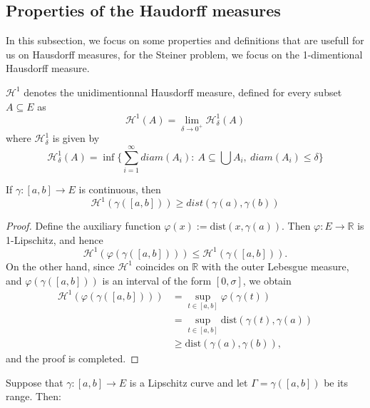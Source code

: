 \documentclass[12pt]{article}
\begin{document}
{\subsection{Properties of the Haudorff measures}

In this subsection, we focus on some properties and definitions that are usefull for us on Hausdorff measures, for the Steiner problem, we focus on the 1-dimentional Hausdorff measure.

\begin{definition}
    $\mathcal{H}^1$ denotes the unidimentionnal Hausdorff measure, defined for every subset $A \subseteq E$ as $$\mathcal{H}^1(A) = \lim\limits_{\delta \rightarrow 0^+} \mathcal{H}_\delta^1(A)$$ where $\mathcal{H}_\delta^1$ is given by $$\mathcal{H}_\delta^1(A) = \inf \{ \sum_{i=1}^{\infty} diam(A_i) : \ A \subseteq \bigcup A_i, \ diam(A_i) \leq \delta \}$$ 
\end{definition}

\begin{lemma}
    If $\gamma : [a, b] \to E$ is continuous, then \[ \mathcal{H}^1(\gamma([a,b])) \ge dist(\gamma(a),\gamma(b)) \]
\end{lemma}

\begin{proof}
    Define the auxiliary function $\varphi(x) := \mathrm{dist}(x, \gamma(a))$. 
    Then $\varphi : E \to \mathbb{R}$ is 1-Lipschitz, and hence
    \[
        \mathcal{H}^1\!\left(\varphi(\gamma([a, b]))\right) \leqslant 
        \mathcal{H}^1\!\left(\gamma([a, b])\right).
    \]
    On the other hand, since $\mathcal{H}^1$ coincides on $\mathbb{R}$ with the 
    outer Lebesgue measure, and $\varphi(\gamma([a, b]))$ is an interval of the 
    form $[0, \sigma]$, we obtain
    \begin{align*}
        \mathcal{H}^1\!\left(\varphi(\gamma([a, b]))\right) 
        &= \sup_{t \in [a, b]} \varphi(\gamma(t)) \\
        &= \sup_{t \in [a, b]} \mathrm{dist}\!\left(\gamma(t), \gamma(a)\right) \\
        &\geqslant \mathrm{dist}\!\left(\gamma(a), \gamma(b)\right),
    \end{align*}
    and the proof is completed.
\end{proof}

\begin{theorem}
    Suppose that $\gamma : [a, b] \to E$ is a Lipschitz curve and let $\Gamma = \gamma([a, b])$ be its range. Then:


\end{theorem}}
\end{document}
